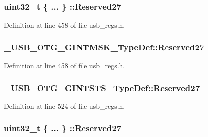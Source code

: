 \hypertarget{group___u_s_b___o_t_g___d_r_i_v_e_r_ga8432b610b65d8758028d0f3d88232141}{
\subsubsection[{Reserved27}]{\setlength{\rightskip}{0pt plus 5cm}uint32\-\_\-t \{ ... \} \-::Reserved27}}\label{group___u_s_b___o_t_g___d_r_i_v_e_r_ga8432b610b65d8758028d0f3d88232141}


Definition at line 458 of file usb\-\_\-regs.\-h.

\hypertarget{group___u_s_b___o_t_g___d_r_i_v_e_r_gad99b5c001b27085480bb91a75d8a63df}{
\subsubsection[{Reserved27}]{ \-\_\-\-U\-S\-B\-\_\-\-O\-T\-G\-\_\-\-G\-I\-N\-T\-M\-S\-K\-\_\-\-Type\-Def\-::\-Reserved27}}\label{group___u_s_b___o_t_g___d_r_i_v_e_r_gad99b5c001b27085480bb91a75d8a63df}


Definition at line 458 of file usb\-\_\-regs.\-h.

\hypertarget{group___u_s_b___o_t_g___d_r_i_v_e_r_gab1be67d79cb4713aa7269a77ae5a68a6}{
\subsubsection[{Reserved27}]{ \-\_\-\-U\-S\-B\-\_\-\-O\-T\-G\-\_\-\-G\-I\-N\-T\-S\-T\-S\-\_\-\-Type\-Def\-::\-Reserved27}}\label{group___u_s_b___o_t_g___d_r_i_v_e_r_gab1be67d79cb4713aa7269a77ae5a68a6}


Definition at line 524 of file usb\-\_\-regs.\-h.

\hypertarget{group___u_s_b___o_t_g___d_r_i_v_e_r_ga1163f96b99454f82176a1ce5cd93d7c6}{
\subsubsection[{Reserved27}]{\setlength{\rightskip}{0pt plus 5cm}uint32\-\_\-t \{ ... \} \-::Reserved27}}\label{group___u_s_b___o_t_g___d_r_i_v_e_r_ga1163f96b99454f82176a1ce5cd93d7c6}


